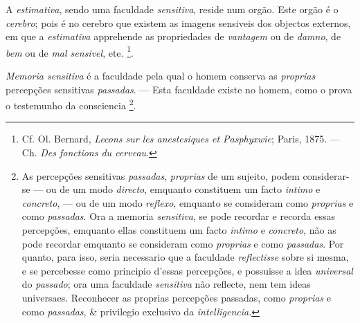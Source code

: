 
A \emph{estimativa}, sendo uma faculdade \emph{sensitiva}, reside num orgão. Este orgão é o \emph{cerebro}; pois é no cerebro que existem as imagens sensiveis dos objectos    externos, em que a \emph{estimativa} apprehende as propriedades de \emph{vantagem} ou de \emph{damno}, de \emph{bem} ou de \emph{mal sensivel}, ete. \footnote{Cf. Ol. Bernard, \emph{Lecons sur les anestesiques et Pasphyxwie}; Paris, 1875. --- Ch. \emph{Des fonctions du cerveau}.}.


\emph{Memoria sensitiva} é a faculdade pela qual o homem conserva as \emph{proprias} percepções sensitivas \emph{passadas}. --- Esta faculdade existe no homem, como o prova o testemunho da consciencia \footnote{As percepções sensitivas \emph{passadas}, \emph{proprias} de um sujeito, podem considerar-se --- ou de um modo \emph{directo}, emquanto constituem um facto \emph{intimo} e \emph{concreto}, --- ou de um modo \emph{reflexo}, emquanto se consideram como \emph{proprias} e como \emph{passadas}. Ora a memoria \emph{sensitiva}, se pode recordar e recorda essas percepções, emquanto ellas constituem um facto \emph{intimo} e \emph{concreto}, não as pode recordar emquanto se consideram como \emph{proprias} e como \emph{passadas}. Por quanto, para isso, seria necessario que a faculdade \emph{reflectisse} sobre si mesma, e se percebesse como principio d'essas percepções, e possuisse a idea \emph{universal} do \emph{passado}; ora uma faculdade \emph{sensitiva} não reflecte, nem tem ideas universaes. Reconhecer as proprias percepções passadas, como \emph{proprias} e como \emph{passadas}, \& privilegio exclusivo da \emph{intelligencia}.}.


